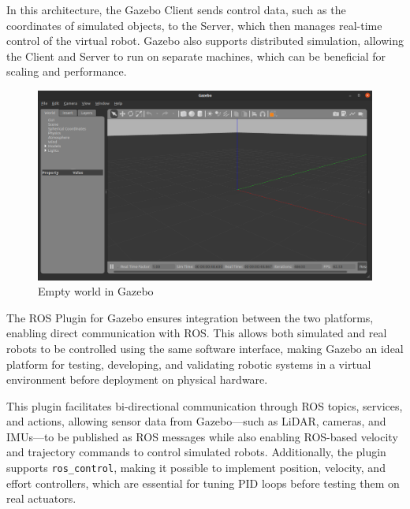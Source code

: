 \documentclass[../../main]{subfiles}
\begin{document}
In this architecture, the Gazebo Client sends control data, such as the coordinates of simulated objects, 
to the Server, which then manages real-time control of the virtual robot. Gazebo also supports distributed simulation, 
allowing the Client and Server to run on separate machines, which can be beneficial for scaling and performance.

\begin{figure}[H]
    \centering
\includegraphics[width=\textwidth]{fig/gazebo_empty_world.png}
\caption{Empty world in Gazebo}
\label{Gazebo empty world} %
\end{figure}

The ROS Plugin for Gazebo ensures  integration between the two platforms, enabling direct communication with ROS. 
This allows both simulated and real robots to be controlled using the same software interface, making Gazebo an ideal platform for testing, 
developing, and validating robotic systems in a virtual environment before deployment on physical hardware.

This plugin facilitates bi-directional communication through ROS topics, services, and actions, allowing sensor data from Gazebo—such as LiDAR, 
cameras, and IMUs—to be published as ROS messages while also enabling ROS-based velocity and trajectory commands to control simulated robots. 
Additionally, the plugin supports \texttt{ros\_control}, making it possible to implement position, velocity, and effort controllers, 
which are essential for tuning PID loops before testing them on real actuators.
\end{document}
